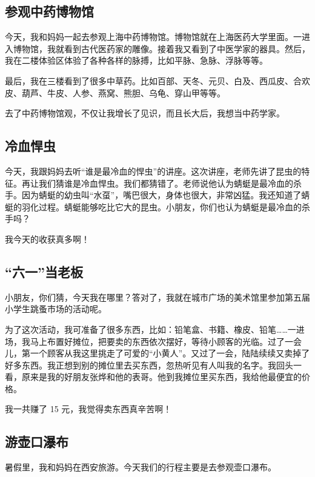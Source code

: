 \documentclass[UTF8,a4paper,titlepage,twoside,10.5pt]{article}
\begin{document}
\subsection{参观中药博物馆}
\label{sec:org5e7f3ea}

今天，我和妈妈一起去参观上海中药博物馆。博物馆就在上海医药大学里面。一进入博物馆，我就看到古代医药家的雕像。接着我又看到了中医学家的器具。然后，我在二楼体验区体验了各种各样的脉搏，比如平脉、急脉、浮脉等等。

最后，我在三楼看到了很多中草药。比如百部、天冬、元贝、白及、西瓜皮、合欢皮、葫芦、牛皮、人参、燕窝、熊胆、乌龟、穿山甲等等。

去了中药博物馆观，不仅让我增长了见识，而且长大后，我想当中药学家。

\subsection{冷血悍虫}
\label{sec:org02b067b}

今天，我跟妈妈去听“谁是最冷血的悍虫”的讲座。这次讲座，老师先讲了昆虫的特征。再让我们猜谁是冷血悍虫。我们都猜错了。老师说他认为蜻蜓是最冷血的杀手。因为蜻蜓的幼虫叫“水虿”，嘴巴很大，身体也很大，非常凶猛。我还知道了蜻蜓的羽化过程。蜻蜓能够吃比它大的昆虫。小朋友，你们也认为蜻蜓是最冷血的杀手吗？

我今天的收获真多啊！

\subsection{“六一”当老板}
\label{sec:org7b72df2}

小朋友，你们猜，今天我在哪里？答对了，我就在城市广场的美术馆里参加第五届小学生跳蚤市场的活动呢。

为了这次活动，我可准备了很多东西，比如：铅笔盒、书籍、橡皮、铅笔……一进场，我马上布置好摊位，把要卖的东西依次摆好，等待小顾客的光临。过了一会儿，第一个顾客从我这里挑走了可爱的“小黄人”。又过了一会，陆陆续续又卖掉了好多东西。我正想到别的摊位里去买东西，忽热听见有人叫我的名字。我回头一看，原来是我的好朋友张烨和他的表哥。他到我摊位里买东西，我给他最便宜的价格。

我一共赚了 15 元，我觉得卖东西真辛苦啊！

\subsection{游壶口瀑布}
\label{sec:orgd80455b}

暑假里，我和妈妈在西安旅游。今天我们的行程主要是去参观壶口瀑布。
\end{document}
